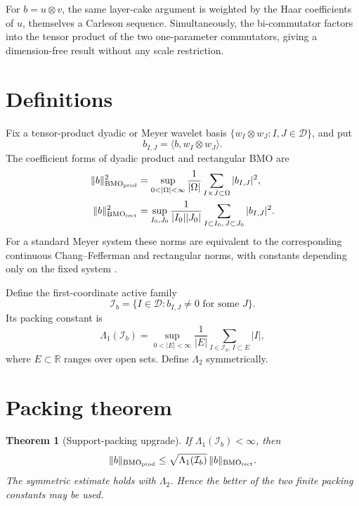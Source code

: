 \documentclass[11pt]{article}
\newtheorem{theorem}{Theorem}
\newcommand{\BMO}{\mathrm{BMO}}
\newcommand{\R}{\mathbb R}
\newcommand{\cI}{\mathcal I}
\begin{document}
For $b=u\otimes v$, the same layer-cake argument is weighted by the Haar
coefficients of $u$, themselves a Carleson sequence.  Simultaneously, the
bi-commutator factors into the tensor product of the two one-parameter
commutators, giving a dimension-free result without any scale restriction.

\section*{Definitions}

Fix a tensor-product dyadic or Meyer wavelet basis
$\{w_I\otimes w_J:I,J\in\mathcal D\}$, and put
\[
 b_{I,J}=\langle b,w_I\otimes w_J\rangle.
\]
The coefficient forms of dyadic product and rectangular BMO are
\begin{align*}
 \|b\|_{\BMO_{\rm prod}}^2
 &=\sup_{0<|\Omega|<\infty}\frac1{|\Omega|}
   \sum_{I\times J\subset\Omega}|b_{I,J}|^2,\\
 \|b\|_{\BMO_{\rm rect}}^2
 &=\sup_{I_0,J_0}\frac1{|I_0||J_0|}
   \sum_{I\subset I_0,\,J\subset J_0}|b_{I,J}|^2.
\end{align*}
For a standard Meyer system these norms are equivalent to the corresponding
continuous Chang--Fefferman and rectangular norms, with constants depending
only on the fixed system \cite{CF}.

Define the first-coordinate active family
\[
 \cI_b=\{I\in\mathcal D:b_{I,J}\ne0\text{ for some }J\}.
\]
Its packing constant is
\[
 \Lambda_1(\cI_b)=
 \sup_{0<|E|<\infty}\frac1{|E|}
 \sum_{I\in\cI_b,\,I\subset E}|I|,
\]
where $E\subset\R$ ranges over open sets.  Define $\Lambda_2$ symmetrically.

\section*{Packing theorem}

\begin{theorem}[Support-packing upgrade]\label{thm:packing}
If $\Lambda_1(\cI_b)<\infty$, then
\[
 \|b\|_{\BMO_{\rm prod}}
 \le \sqrt{\Lambda_1(\cI_b)}\,
       \|b\|_{\BMO_{\rm rect}}.
\]
The symmetric estimate holds with $\Lambda_2$.  Hence the better of the two
finite packing constants may be used.
\end{theorem}
\end{document}
